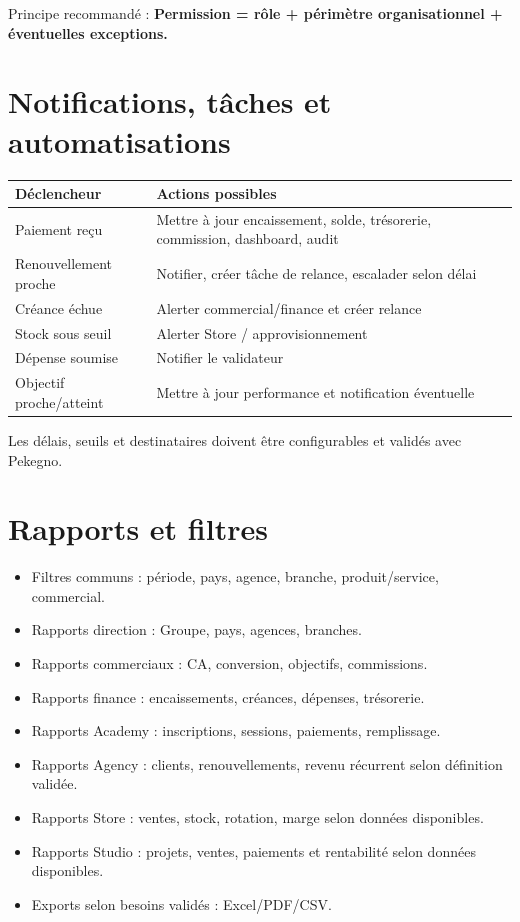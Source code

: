 \documentclass[11pt,a4paper]{article}
\newcommand{\tableheader}[2]{\textbf{#1} & \textbf{#2} \\ \hline}
\begin{document}
Principe recommandé : \textbf{Permission = rôle + périmètre organisationnel + éventuelles exceptions.}

\section{Notifications, tâches et automatisations}

\begin{tabularx}{\textwidth}{|l|X|}
\hline
\tableheader{Déclencheur}{Actions possibles}
Paiement reçu & Mettre à jour encaissement, solde, trésorerie, commission, dashboard, audit \\ \hline
Renouvellement proche & Notifier, créer tâche de relance, escalader selon délai \\ \hline
Créance échue & Alerter commercial/finance et créer relance \\ \hline
Stock sous seuil & Alerter Store / approvisionnement \\ \hline
Dépense soumise & Notifier le validateur \\ \hline
Objectif proche/atteint & Mettre à jour performance et notification éventuelle \\ \hline
\end{tabularx}

Les délais, seuils et destinataires doivent être configurables et validés avec Pekegno.

\section{Rapports et filtres}

\begin{itemize}
  \item Filtres communs : période, pays, agence, branche, produit/service, commercial.
  \item Rapports direction : Groupe, pays, agences, branches.
  \item Rapports commerciaux : CA, conversion, objectifs, commissions.
  \item Rapports finance : encaissements, créances, dépenses, trésorerie.
  \item Rapports Academy : inscriptions, sessions, paiements, remplissage.
  \item Rapports Agency : clients, renouvellements, revenu récurrent selon définition validée.
  \item Rapports Store : ventes, stock, rotation, marge selon données disponibles.
  \item Rapports Studio : projets, ventes, paiements et rentabilité selon données disponibles.
  \item Exports selon besoins validés : Excel/PDF/CSV.
\end{itemize}
\end{document}
